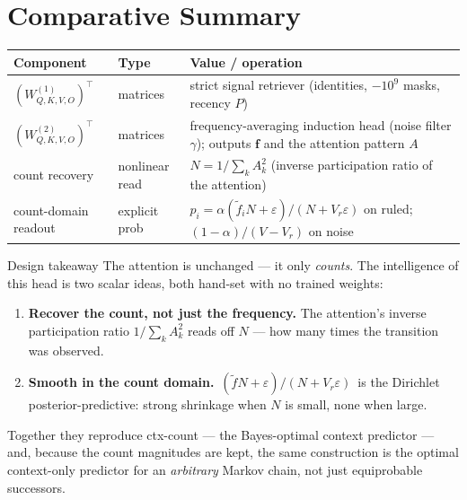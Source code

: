 \documentclass[11pt]{article}
\newcommand{\T}{^{\!\top}}
\newcommand{\fvec}{\mathbf{f}}
\begin{document}
\section{Comparative Summary}
\begin{center}\small
\begin{tabular}{@{}ll p{9.0cm}@{}}
\toprule
Component & Type & Value / operation\\
\midrule
$(W^{(1)}_{Q,K,V,O})\T$ & matrices & strict signal retriever (identities, $-10^9$ masks, recency $P$)\\
$(W^{(2)}_{Q,K,V,O})\T$ & matrices & frequency-averaging induction head (noise filter $\gamma$); outputs $\fvec$ and the attention pattern $A$\\
count recovery & nonlinear read & $N=1/\sum_k A_k^2$ (inverse participation ratio of the attention)\\
count-domain readout & explicit prob & $p_i=\alpha(\tilde f_i N+\varepsilon)/(N+V_r\varepsilon)$ on ruled; $(1-\alpha)/(V-V_r)$ on noise\\
\bottomrule
\end{tabular}
\end{center}

\begin{takebox}{Design takeaway}
The attention is unchanged --- it only \emph{counts}. The intelligence of this head is two scalar ideas,
both hand-set with no trained weights:
\begin{enumerate}[nosep,leftmargin=1.4em]
\item \textbf{Recover the count, not just the frequency.} The attention's inverse participation ratio
$1/\sum_k A_k^2$ reads off $N$ --- how many times the transition was observed.
\item \textbf{Smooth in the count domain.} $\,(\tilde f N+\varepsilon)/(N+V_r\varepsilon)\,$ is the
Dirichlet posterior-predictive: strong shrinkage when $N$ is small, none when large.
\end{enumerate}
Together they reproduce ctx-count --- the Bayes-optimal context predictor --- and, because the count
magnitudes are kept, the same construction is the optimal context-only predictor for an \emph{arbitrary}
Markov chain, not just equiprobable successors.
\end{takebox}
\end{document}
